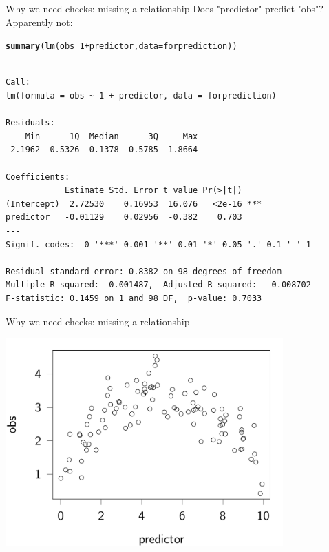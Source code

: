 \documentclass[10pt]{beamer}\usepackage[]{graphicx}\usepackage[]{color}
\makeatletter
\newcommand{\hlnum}[1]{\textcolor[rgb]{0.686,0.059,0.569}{#1}}%
\newcommand{\hlopt}[1]{\textcolor[rgb]{0,0,0}{#1}}%
\newcommand{\hlstd}[1]{\textcolor[rgb]{0.345,0.345,0.345}{#1}}%
\newcommand{\hlkwc}[1]{\textcolor[rgb]{0.333,0.667,0.333}{#1}}%
\newcommand{\hlkwd}[1]{\textcolor[rgb]{0.737,0.353,0.396}{\textbf{#1}}}%
\newenvironment{kframe}{%
 \def\at@end@of@kframe{}%
 \ifinner\ifhmode%
  \def\at@end@of@kframe{\end{minipage}}%
  \begin{minipage}{\columnwidth}%
 \fi\fi%
 \def\FrameCommand##1{\hskip\@totalleftmargin \hskip-\fboxsep
 \colorbox{shadecolor}{##1}\hskip-\fboxsep
     \hskip-\linewidth \hskip-\@totalleftmargin \hskip\columnwidth}%
 \MakeFramed {\advance\hsize-\width
   \@totalleftmargin\z@ \linewidth\hsize
   \@setminipage}}%
 {\par\unskip\endMakeFramed%
 \at@end@of@kframe}
\newenvironment{knitrout}{}{} %
\makeatother
\begin{document}
\begin{frame}[fragile]{Why we need checks: missing a relationship}
  Does "predictor" predict "obs"? Apparently not:
\begin{knitrout}
\color{fgcolor}\begin{kframe}
\begin{alltt}
  \hlkwd{summary}\hlstd{(}\hlkwd{lm}\hlstd{(obs} \hlopt{~} \hlnum{1} \hlopt{+} \hlstd{predictor,} \hlkwc{data}\hlstd{=forprediction) )}
\end{alltt}
\begin{verbatim}

Call:
lm(formula = obs ~ 1 + predictor, data = forprediction)

Residuals:
    Min      1Q  Median      3Q     Max 
-2.1962 -0.5326  0.1378  0.5785  1.8664 

Coefficients:
            Estimate Std. Error t value Pr(>|t|)    
(Intercept)  2.72530    0.16953  16.076   <2e-16 ***
predictor   -0.01129    0.02956  -0.382    0.703    
---
Signif. codes:  0 '***' 0.001 '**' 0.01 '*' 0.05 '.' 0.1 ' ' 1

Residual standard error: 0.8382 on 98 degrees of freedom
Multiple R-squared:  0.001487,	Adjusted R-squared:  -0.008702 
F-statistic: 0.1459 on 1 and 98 DF,  p-value: 0.7033
\end{verbatim}
\end{kframe}
\end{knitrout}
\end{frame}

\begin{frame}[fragile]{Why we need checks: missing a relationship}

\begin{knitrout}
\color{fgcolor}
\includegraphics[width=0.8\textwidth,height=0.6\textwidth]{figure/plot0-1} 

\end{knitrout}

\end{frame}
\end{document}
